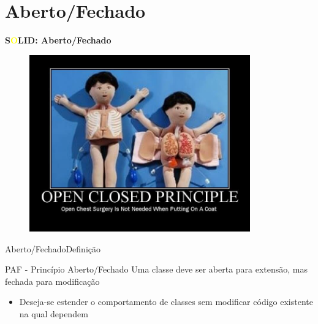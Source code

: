 \documentclass[10pt]{beamer}
\begin{document}
\section{Aberto/Fechado}

\begin{frame}{\textbf{S\textcolor{yellow}{O}LID: Aberto/Fechado}}
	\begin{figure}[ht]
 		\centering
    	\includegraphics[width=0.85\textwidth, keepaspectratio=true]{images/openclosedprinciple.jpg}
	\end{figure}
\end{frame}

\begin{frame}{Aberto/Fechado}{Definição}

  \begin{block}{PAF - Princípio Aberto/Fechado}
  Uma classe deve ser aberta para extensão, mas fechada
  para modificação
  \end{block}

  \begin{itemize}
    \item Deseja-se estender o comportamento de classes
    sem modificar código existente na qual dependem
  \end{itemize}

\end{frame}

\end{document}
